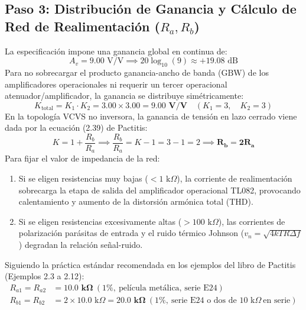 \documentclass[a4paper,11pt]{article}
\begin{document}
\subsection{Paso 3: Distribución de Ganancia y Cálculo de Red de Realimentación \texorpdfstring{($R_a, R_b$)}{(Ra, Rb)}}
La especificación impone una ganancia global en continua de:
\begin{equation}
A_v = 9.00\text{ V/V} \implies 20\log_{10}(9) \approx +19.08\text{ dB}
\end{equation}
Para no sobrecargar el producto ganancia-ancho de banda ($\text{GBW}$) de los amplificadores operacionales ni requerir un tercer operacional atenuador/amplificador, la ganancia se distribuye simétricamente:
\begin{equation}
K_{\text{total}} = K_1 \cdot K_2 = 3.00 \times 3.00 = \mathbf{9.00\text{ V/V}} \quad (K_1 = 3, \quad K_2 = 3)
\end{equation}
En la topología VCVS no inversora, la ganancia de tensión en lazo cerrado viene dada por la ecuación (2.39) de Pactitis:
\begin{equation}
K = 1 + \frac{R_b}{R_a} \implies \frac{R_b}{R_a} = K - 1 = 3 - 1 = 2 \implies \mathbf{R_b = 2 R_a}
\end{equation}
Para fijar el valor de impedancia de la red:
\begin{enumerate}
    \item Si se eligen resistencias muy bajas ($< 1\text{ k}\Omega$), la corriente de realimentación sobrecarga la etapa de salida del amplificador operacional TL082, provocando calentamiento y aumento de la distorsión armónica total (THD).
    \item Si se eligen resistencias excesivamente altas ($> 100\text{ k}\Omega$), las corrientes de polarización parásitas de entrada y el ruido térmico Johnson ($v_n = \sqrt{4kTR\Delta f}$) degradan la relación señal-ruido.
\end{enumerate}
Siguiendo la práctica estándar recomendada en los ejemplos del libro de Pactitis (Ejemplos 2.3 a 2.12):
\begin{align}
R_{a1} = R_{a2} &= \mathbf{10.0\text{ k}\Omega}\ (1\%,\ \text{película metálica, serie E24}) \\
R_{b1} = R_{b2} &= 2 \times 10.0\text{ k}\Omega = \mathbf{20.0\text{ k}\Omega}\ (1\%,\ \text{serie E24 o dos de } 10\text{ k}\Omega\ \text{en serie})
\end{align}
\end{document}
